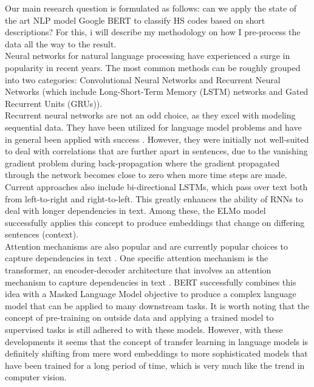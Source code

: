 Our main research question is formulated as follows: can we apply the state of the art NLP model Google BERT to classify HS codes based on short descriptions? For this, i will describe my methodology on how I pre-process the data all the way to the result.\\


Neural networks for natural language processing have experienced a surge in popularity in recent years. The most common methods can be roughly grouped into two categories: Convolutional Neural Networks and Recurrent Neural Networks (which include Long-Short-Term Memory (LSTM) networks and Gated Recurrent Units (GRUs)).\\


Recurrent neural networks are not an odd choice, as they excel with modeling sequential data. They have been utilized for language model problems and have in general been applied with success \cite{Mikolov2010a, Chung2014, Lai2015, Howard2018, Xu}. However, they were initially not well-suited to deal with correlations that are further apart in sentences, due to the vanishing gradient problem during back-propagation where the gradient propagated through the network becomes close to zero when more time steps are made.\\


Current approaches also include bi-directional LSTMs, which pass over text both from left-to-right and right-to-left. This greatly enhances the ability of RNNs to deal with longer dependencies in text. Among these, the ELMo model \cite{Peters2018} successfully applies this concept to produce embeddings that change on differing sentences (context).\\
Attention mechanisms are also popular and are currently popular choices to capture dependencies in text \cite{Lin2017, Openai}. One specific attention mechanism is the transformer, an encoder-decoder architecture that involves an attention mechanism to capture dependencies in text \cite{Vaswani2017}. BERT \cite{Devlin2018} successfully combines this idea with a Masked Language Model objective to produce a complex language model that can be applied to many downstream tasks. It is worth noting that the concept of pre-training on outside data and applying a trained model to supervised tasks is still adhered to with these models. However, with these developments it seems that the concept of transfer learning in language models is definitely shifting from mere word embeddings to more sophisticated models that have been trained for a long period of time, which is very much like the trend in computer vision.\\


